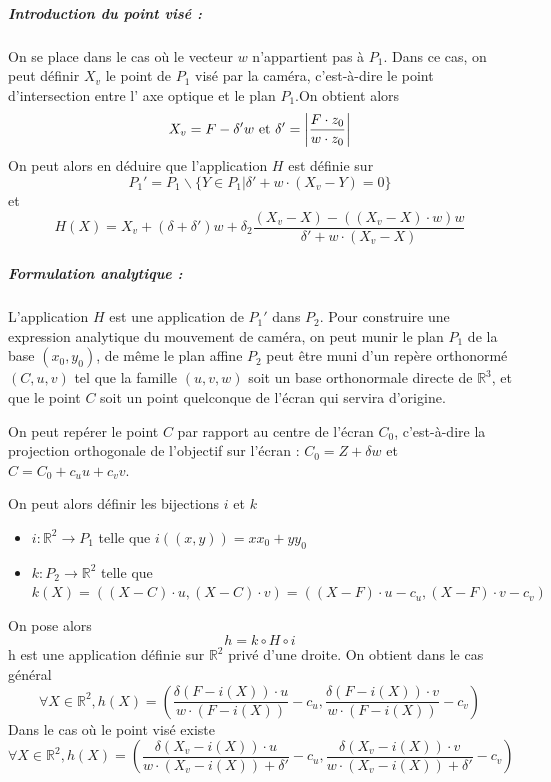\subparagraph{Introduction du point visé :}
On se place dans le cas où le vecteur $w$ n'appartient pas à $P_{1}$. Dans ce cas, on peut définir $X_{v}$  le point de $P_{1}$ visé par la caméra, c'est-à-dire le point d'intersection entre l' axe optique et le plan $P_{1}$.On obtient alors 
\begin{equation*}
X_{v}=F-\delta'w \text{ et }\delta'=\small{\left|\frac{F \cdot z_{0}}{w\cdot z_{0}} \right|}
\end{equation*}
On peut alors en déduire que l'application $H$ est définie sur \[P_{1}'=P_{1}\backslash \{Y\in P_{1}|\delta'+w\cdot(X_{v}-Y)=0\}\] et 
\begin{equation*}
H(X)=X_{v}+(\delta+\delta')w+\delta_{2}\frac{(X_{v}-X)-\left((X_{v}-X)\cdot w\right) w}{\delta'+w\cdot (X_{v}-X)}
\end{equation*}



\subparagraph{Formulation analytique :}

L'application $H$ est une application de $P_{1}'$ dans $P_{2}$. Pour construire une expression analytique du mouvement de caméra, on peut munir le plan $P_{1}$ de la base $(x_{0},y_{0})$, de même le plan affine $P_{2}$ peut être muni d'un repère orthonormé $(C,u,v)$ tel que la famille $(u,v,w)$ soit un base orthonormale directe de $\mathbb{R}^{3}$, et que le point $C$ soit un point quelconque de l'écran qui servira d'origine.

On peut repérer le point $C$ par rapport au centre de l'écran $C_{0}$, c'est-à-dire la projection orthogonale de l'objectif sur l'écran : $C_{0}=Z+\delta w$ et $C=C_{0}+c_{u}u+c_{v}v$.

On peut alors définir les bijections $i$ et $k$
\begin{itemize}
\item $i:\mathbb{R}^{2}\rightarrow P_{1}$ telle que $i((x,y))=xx_{0}+yy_{0}$
\item $k:P_{2}\rightarrow \mathbb{R}^{2}$ telle que $k(X)= ((X-C)\cdot u,(X-C)\cdot v)=((X-F)\cdot u-c_{u}, (X-F)\cdot v-c_{v})$
\end{itemize}
On pose alors 
\begin{equation*}
h=k\circ H \circ i
\end{equation*}
h est une application définie sur $\mathbb{R}^{2}$ privé d'une droite. On obtient dans le cas général
\begin{equation*}
\forall X\in \mathbb{R}^{2}, h(X)=\left(\frac{\delta (F-i(X))\cdot u}{w \cdot (F-i(X))}-c_{u},\frac{\delta (F-i(X))\cdot v}{w \cdot (F-i(X))} -c_{v} \right) 
\end{equation*} 
Dans le cas où le point visé existe
\begin{equation*}
\forall X\in \mathbb{R}^{2}, h(X)=\left(\frac{\delta (X_{v}-i(X))\cdot u}{w \cdot (X_{v}-i(X))+\delta'}-c_{u},\frac{\delta (X_{v}-i(X))\cdot v}{w \cdot (X_{v}-i(X))+\delta'} -c_{v} \right) 
\end{equation*}




